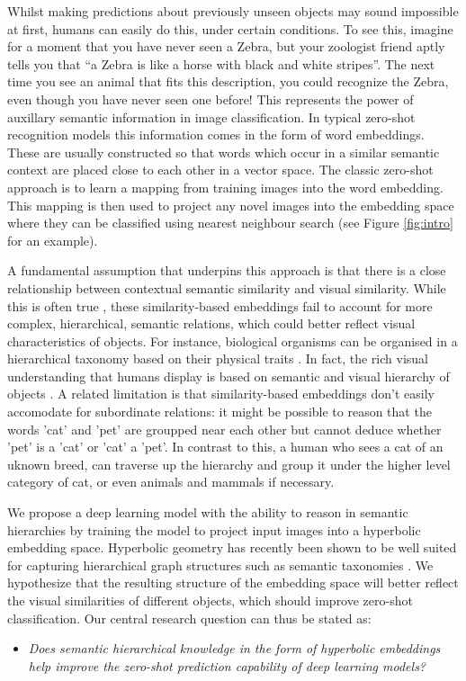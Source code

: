 \documentclass[12pt]{report}
\begin{document}
Whilst making predictions about previously unseen objects may sound impossible at first, humans can easily do this, under certain conditions. To see this, imagine for a moment that you have never seen a Zebra, but your zoologist friend aptly tells you that ``a Zebra is like a horse with black and white stripes''. The next time you see an animal that fits this description, you could recognize the Zebra, even though you have never seen one before! This represents the power of auxillary semantic information in image classification. In typical zero-shot recognition models this information comes in the form of word embeddings. These are usually constructed so that words which occur in a similar semantic context are placed close to each other in a vector space. The classic zero-shot approach is to learn a mapping from training images into the word embedding. This mapping is then used to project any novel images into the embedding space where they can be classified using nearest neighbour search (see Figure \ref{fig:intro} for an example). 

A fundamental assumption that underpins this approach is that there is a close relationship between contextual semantic similarity and visual similarity. While this is often true \cite{Deselaers2011}, these similarity-based embeddings fail to account for more complex, hierarchical, semantic relations, which could better reflect visual characteristics of objects. For instance, biological organisms can be organised in a hierarchical taxonomy based on their physical traits \cite{Ohl2015}. In fact, the rich visual understanding that humans display is based on semantic and visual hierarchy of objects \cite{Joliceur1984}. A related limitation is that similarity-based embeddings don't easily accomodate for subordinate relations: it might be possible to reason that the words 'cat' and 'pet' are groupped near each other but cannot deduce whether 'pet' is a 'cat' or 'cat' a 'pet'. In contrast to this, a human who sees a cat of an uknown breed, can traverse up the hierarchy and group it under the higher level category of cat, or even animals and mammals if necessary. 

We propose a deep learning model with the ability to reason in semantic hierarchies by training the model to project input images into a hyperbolic embedding space. Hyperbolic geometry has recently been shown to be well suited for capturing hierarchical graph structures such as semantic taxonomies \cite{Nickel2017, Chamberlain2017}. We hypothesize that the resulting structure of the embedding space will better reflect the visual similarities of different objects, which should improve zero-shot classification. Our central research question can thus be stated as: 
\begin{itemize}
  \item \textit{Does semantic hierarchical knowledge in the form of hyperbolic embeddings help improve the zero-shot prediction capability of deep learning models?}
\end{itemize}
\end{document}
